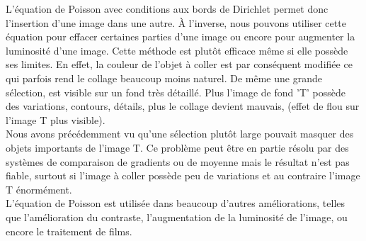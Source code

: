 L'équation de Poisson avec conditions aux bords de Dirichlet permet donc l'insertion d'une image dans une autre. À l'inverse, nous pouvons utiliser cette équation pour effacer certaines parties d'une image ou encore pour augmenter la luminosité d'une image. Cette méthode est plutôt efficace même si elle possède ses limites. En effet, la couleur de l'objet à coller est par conséquent modifiée ce qui parfois rend le collage beaucoup moins naturel. De même une grande sélection, est visible sur un fond très détaillé. Plus l'image de fond 'T' possède des variations, contours, détails, plus le collage devient mauvais, (effet de flou sur l'image T plus visible). \\
Nous avons précédemment vu qu'une sélection plutôt large pouvait masquer des objets importants de l'image T. Ce problème peut être en partie résolu par des systèmes de comparaison de gradients ou de moyenne mais le résultat n'est pas fiable, surtout si l'image à coller possède peu de variations et au contraire l'image T énormément.\\ 
L'équation de Poisson est utilisée dans beaucoup d'autres améliorations, telles que l'amélioration du contraste, l'augmentation de la luminosité de l'image, ou encore le traitement de films.